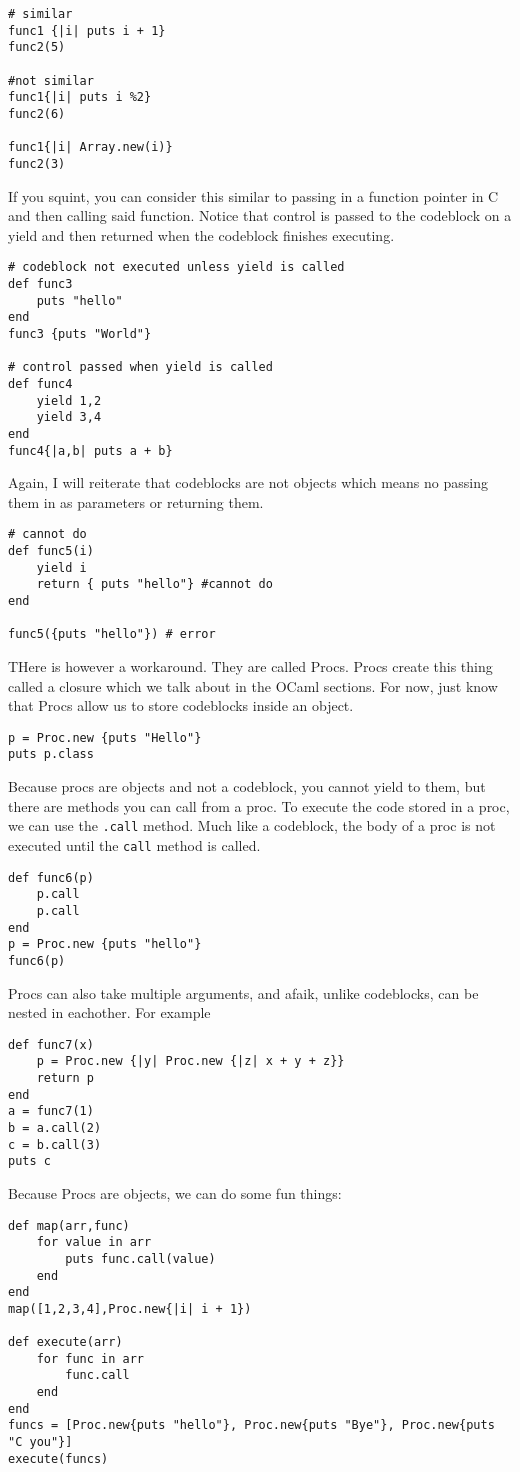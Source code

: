 \documentclass[main.tex]{subfiles}
\begin{document}
\begin{lstlisting}[style=MyRubyStyle]
# similar
func1 {|i| puts i + 1}
func2(5) 

#not similar
func1{|i| puts i %2}
func2(6)

func1{|i| Array.new(i)}
func2(3)
\end{lstlisting}
If you squint, you can consider this similar to passing in a function pointer in C and then calling said function. 
Notice that control is passed to the codeblock on a yield and then returned when the codeblock finishes executing. 
\begin{lstlisting}[style=MyRubyStyle]
# codeblock not executed unless yield is called
def func3 
    puts "hello"
end
func3 {puts "World"}

# control passed when yield is called
def func4
    yield 1,2
    yield 3,4
end
func4{|a,b| puts a + b}
\end{lstlisting}

Again, I will reiterate that codeblocks are not objects which means no passing them in as parameters or returning them. 
\begin{lstlisting}[style=MyRubyStyle]
# cannot do
def func5(i)
    yield i
    return { puts "hello"} #cannot do
end

func5({puts "hello"}) # error
\end{lstlisting}

THere is however a workaround. They are called Procs. Procs create this thing called a closure which we talk about in the OCaml sections. For now, just know that Procs allow us to store codeblocks inside an object. 
\begin{lstlisting}[style=MyRubyStyle]
p = Proc.new {puts "Hello"}
puts p.class
\end{lstlisting}
Because procs are objects and not a codeblock, you cannot yield to them, but there are methods you can call from a proc. To execute the code stored in a proc, we can use the \texttt{.call} method. Much like a codeblock, the body of a proc is not executed until the \texttt{call} method is called. 
\begin{lstlisting}[style=MyRubyStyle]
def func6(p)
    p.call
    p.call
end
p = Proc.new {puts "hello"}
func6(p)
\end{lstlisting}
Procs can also take multiple arguments, and afaik, unlike codeblocks, can be nested in eachother. For example
\begin{lstlisting}[style=MyRubyStyle]
def func7(x)
    p = Proc.new {|y| Proc.new {|z| x + y + z}}
    return p
end
a = func7(1)
b = a.call(2)
c = b.call(3)
puts c
\end{lstlisting}
Because Procs are objects, we can do some fun things:
\begin{lstlisting}[style=MyRubyStyle]
def map(arr,func)
    for value in arr
        puts func.call(value)
    end
end
map([1,2,3,4],Proc.new{|i| i + 1})

def execute(arr)
    for func in arr
        func.call
    end
end
funcs = [Proc.new{puts "hello"}, Proc.new{puts "Bye"}, Proc.new{puts "C you"}]
execute(funcs)
\end{lstlisting}
\end{document}
